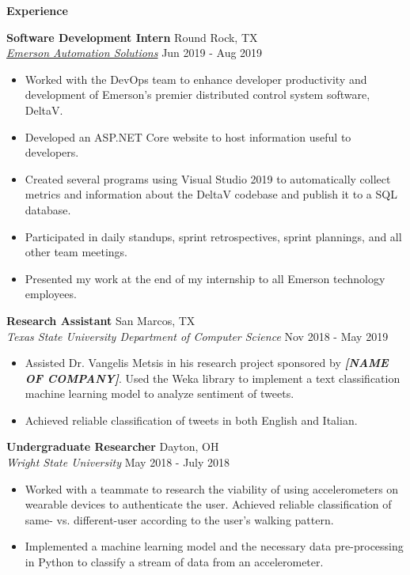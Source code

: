 \documentclass[letterpaper, 10pt]{article}
\newcommand{\resheading}[1]{
    \begin{mdframed}[
        backgroundcolor=black!15,
        linewidth=0.75pt,
        innertopmargin=4pt,
        innerbottommargin=4pt,
        skipabove=6pt,
        skipbelow=2pt]
        \textbf{\large #1}
    \end{mdframed}
}
\newcommand{\ressubheading}[4]{
    \textbf{#1} \hfill #2 \\[0pt]
    \textit{#3} \hfill #4 \\[0pt]
}
\newenvironment{resitemize}{
    \vspace{-6pt}
    \begin{itemize}
    \setlength\itemsep{-2pt}
}{
    \end{itemize}
}
\begin{document}
\begin{NoHyper}
%
%


\resheading{Experience}
\ressubheading{Software Development Intern}{Round Rock, TX}{\href{https://www.emerson.com/en-us/automation-solutions}{Emerson Automation Solutions}}{Jun 2019 - Aug 2019}
    \begin{resitemize}
        \item Worked with the DevOps team to enhance developer productivity and development of Emerson's premier distributed control system software, DeltaV.
        \item Developed an ASP.NET Core website to host information useful to developers.
        \item Created several programs using Visual Studio 2019 to automatically collect metrics and information about the DeltaV codebase and publish it to a SQL database.
        \item Participated in daily standups, sprint retrospectives, sprint plannings, and all other team meetings.
        \item Presented my work at the end of my internship to all Emerson technology  employees.
    \end{resitemize}
\ressubheading{Research Assistant}{San Marcos, TX}{Texas State University Department of Computer Science}{Nov 2018 - May 2019}
    \begin{resitemize}
        \item Assisted Dr. Vangelis Metsis in his research project sponsored by \textbf{\textit{[NAME OF COMPANY]}}. Used the Weka library to implement a text classification machine learning model to analyze sentiment of tweets.
        \item Achieved reliable classification of tweets in both English and Italian.
    \end{resitemize}
\ressubheading{Undergraduate Researcher}{Dayton, OH}{Wright State University}{May 2018 - July 2018}
    \begin{resitemize}
        \item Worked with a teammate to research the viability of using accelerometers on wearable devices to authenticate the user. Achieved reliable classification of same- vs. different-user according to the user's walking pattern.
        \item Implemented a machine learning model and the necessary data pre-processing in Python to classify a stream of data from an accelerometer.

\end{resitemize}
\end{NoHyper}
\end{document}
